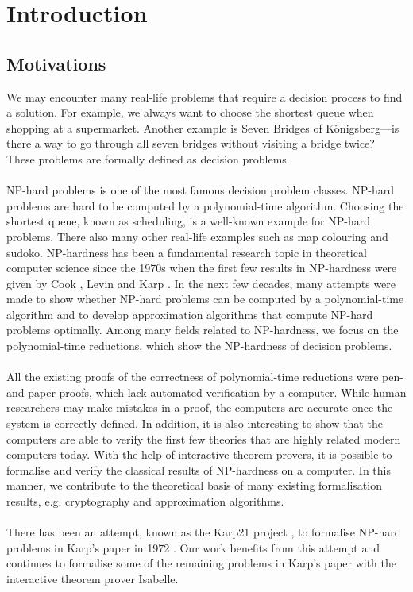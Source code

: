 \chapter{Introduction}\label{chapter:introduction}
\section{Motivations}
We may encounter many real-life problems that require a decision process to find a solution. 
For example, we always want to choose the shortest queue when shopping at a supermarket. 
Another example is Seven Bridges of Königsberg---is there a way to go through all seven bridges 
without visiting a bridge twice? These problems are formally defined as decision problems.\\\\
NP-hard problems is one of the most famous decision problem classes.
NP-hard problems are hard to be computed by a polynomial-time algorithm. Choosing the shortest queue, 
known as scheduling, is a well-known example for NP-hard problems. There also many other real-life examples
such as map colouring and sudoko.
NP-hardness has been a fundamental research topic in theoretical computer science since the 1970s
when the first few results in NP-hardness were given by Cook \cite{cook2023complexity}, Levin \cite{levin1973universal} 
and Karp \cite{karp2010reducibility}. 
In the next few decades, many attempts were made to show whether NP-hard problems can be computed by a polynomial-time algorithm and to develop approximation algorithms that compute NP-hard problems optimally. 
Among many fields related to NP-hardness, we focus on the polynomial-time reductions, which show the NP-hardness of decision problems. \\\\
All the existing proofs of the correctness of polynomial-time reductions were pen-and-paper proofs, 
which lack automated verification by a computer. 
While human researchers may make mistakes in a proof, the computers are accurate once the system is correctly defined. In addition, 
it is also interesting to show that the computers are able to verify the first few theories that are highly related modern computers today.
With the help of interactive theorem provers, 
it is possible to formalise and verify the classical results of NP-hardness on a computer.
In this manner, we contribute to the theoretical basis of many existing formalisation results, 
e.g. cryptography and approximation algorithms. \\\\ 
There has been an attempt, known as the Karp21 project \cite{polyred}, to formalise NP-hard problems in Karp's paper in 1972 \cite{karp2010reducibility}. 
Our work benefits from this attempt and continues to formalise some of the remaining problems in Karp's paper 
with the interactive theorem prover Isabelle. 

